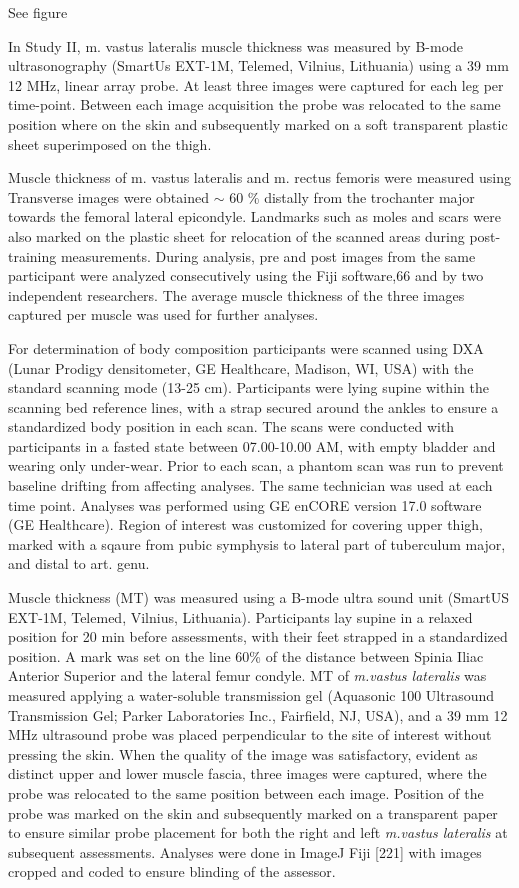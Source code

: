 \documentclass[twoside,10pt]{gihclass} %
\begin{document}
See figure

In Study II, m. vastus lateralis muscle thickness was measured by B-mode ultrasonography (SmartUs EXT-1M, Telemed, Vilnius, Lithuania) using a 39 mm 12 MHz, linear array probe. At least three images were captured for each leg per time-point. Between each image acquisition the probe was relocated to the same position where on the skin and subsequently marked on a soft transparent plastic sheet superimposed on the thigh.

Muscle thickness of m. vastus lateralis and m. rectus femoris were measured using Transverse images were obtained \(\sim\) 60 \% distally from the trochanter major towards the femoral lateral epicondyle. Landmarks such as moles and scars were also marked on the plastic sheet for relocation of the scanned areas during post-training measurements. During analysis, pre and post images from the same participant were analyzed consecutively using the Fiji software,66 and by two independent researchers. The average muscle thickness of the three images captured per muscle was used for further analyses.

For determination of body composition participants were scanned using DXA (Lunar Prodigy densitometer, GE Healthcare, Madison, WI, USA) with the standard scanning mode (13-25 cm). Participants were lying supine within the scanning bed reference lines, with a strap secured around the ankles to ensure a standardized body position in each scan. The scans were conducted with participants in a fasted state between 07.00-10.00 AM, with empty bladder and wearing only under-wear. Prior to each scan, a phantom scan was run to prevent baseline drifting from affecting analyses. The same technician was used at each time point. Analyses was performed using GE enCORE version 17.0 software (GE Healthcare). Region of interest was customized for covering upper thigh, marked with a sqaure from pubic symphysis to lateral part of tuberculum major, and distal to art. genu.

Muscle thickness (MT) was measured using a B-mode ultra sound unit (SmartUS EXT-1M, Telemed, Vilnius, Lithuania). Participants lay supine in a relaxed position for 20 min before assessments, with their feet strapped in a standardized position. A mark was set on the line 60\% of the distance between Spinia Iliac Anterior Superior and the lateral femur condyle. MT of \emph{m.vastus lateralis} was measured applying a water-soluble transmission gel (Aquasonic 100 Ultrasound Transmission Gel; Parker Laboratories Inc., Fairfield, NJ, USA), and a 39 mm 12 MHz ultrasound probe was placed perpendicular to the site of interest without pressing the skin. When the quality of the image was satisfactory, evident as distinct upper and lower muscle fascia, three images were captured, where the probe was relocated to the same position between each image. Position of the probe was marked on the skin and subsequently marked on a transparent paper to ensure similar probe placement for both the right and left \emph{m.vastus lateralis} at subsequent assessments. Analyses were done in ImageJ Fiji {[}221{]} with images cropped and coded to ensure blinding of the assessor.
\end{document}
